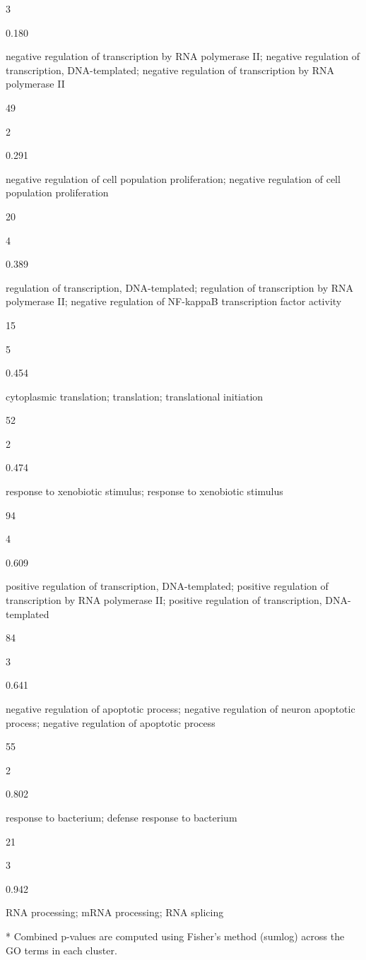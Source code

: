 \documentclass[
  letterpaper,
  DIV=11,
  numbers=noendperiod,
  openany,
  oneside]{scrreprt}
\begin{document}
3

0.180

negative regulation of transcription by RNA polymerase II; negative
regulation of transcription, DNA-templated; negative regulation of
transcription by RNA polymerase II

49

2

0.291

negative regulation of cell population proliferation; negative
regulation of cell population proliferation

20

4

0.389

regulation of transcription, DNA-templated; regulation of transcription
by RNA polymerase II; negative regulation of NF-kappaB transcription
factor activity

15

5

0.454

cytoplasmic translation; translation; translational initiation

52

2

0.474

response to xenobiotic stimulus; response to xenobiotic stimulus

94

4

0.609

positive regulation of transcription, DNA-templated; positive regulation
of transcription by RNA polymerase II; positive regulation of
transcription, DNA-templated

84

3

0.641

negative regulation of apoptotic process; negative regulation of neuron
apoptotic process; negative regulation of apoptotic process

55

2

0.802

response to bacterium; defense response to bacterium

21

3

0.942

RNA processing; mRNA processing; RNA splicing

* Combined p-values are computed using Fisher's method (sumlog) across
the GO terms in each cluster.
\end{document}
